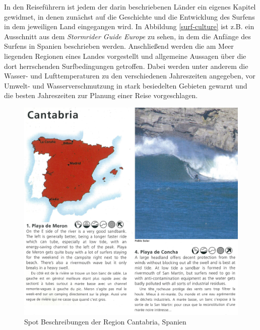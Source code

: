 In den Reiseführern ist jedem der darin beschriebenen Länder ein
eigenes Kapitel gewidmet, in denen zunächst auf die Geschichte und die
Entwicklung des Surfens in dem jeweiligen Land eingegangen wird. In
Abbildung \ref{surf-culture} ist z.B. ein Ausschnitt aus dem
\textit{Stormrider Guide Europe} zu sehen, in dem die Anfänge des
Surfens in Spanien beschrieben werden. Anschließend werden die am Meer
liegenden Regionen eines Landes vorgestellt und allgemeine Aussagen
über die dort herrschenden Surfbedingungen getroffen. Dabei werden
unter anderem die Wasser- und Lufttemperaturen zu den verschiedenen
Jahreszeiten angegeben, vor Umwelt- und Wasserverschmutzung in stark
besiedelten Gebieten gewarnt und die besten Jahreszeiten zur Planung
einer Reise vorgeschlagen.

\begin{figure}[h]
  \includegraphics[width=\textwidth]{bilder/spot-descriptions}
  \caption{Spot Beschreibungen der Region Cantabria, Spanien}
  \label{spot-descriptions}
\end{figure}

